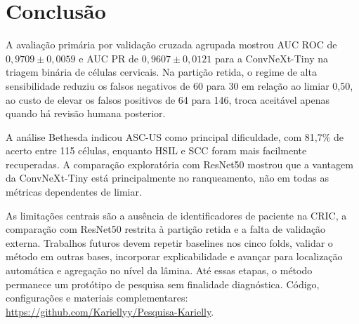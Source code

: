 \section{Conclusão}

A avaliação primária por validação cruzada agrupada mostrou AUC ROC de
$0{,}9709\pm0{,}0059$ e AUC PR de $0{,}9607\pm0{,}0121$ para a ConvNeXt-Tiny na
triagem binária de células cervicais. Na partição retida, o regime de alta
sensibilidade reduziu os falsos negativos de 60 para 30 em relação ao limiar
0,50, ao custo de elevar os falsos positivos de 64 para 146, troca aceitável
apenas quando há revisão humana posterior.

A análise Bethesda indicou ASC-US como principal dificuldade, com 81,7\% de
acerto entre 115 células, enquanto HSIL e SCC foram mais facilmente
recuperadas. A comparação exploratória com ResNet50 mostrou que a vantagem da
ConvNeXt-Tiny está principalmente no ranqueamento, não em todas as métricas
dependentes de limiar.

As limitações centrais são a ausência de identificadores de paciente na CRIC, a
comparação com ResNet50 restrita à partição retida e a falta de validação
externa. Trabalhos futuros devem repetir baselines nos cinco folds, validar o
método em outras bases, incorporar explicabilidade e avançar para localização
automática e agregação no nível da lâmina. Até essas etapas, o método permanece
um protótipo de pesquisa sem finalidade diagnóstica. Código, configurações e
materiais complementares: \url{https://github.com/Kariellyy/Pesquisa-Karielly}.
